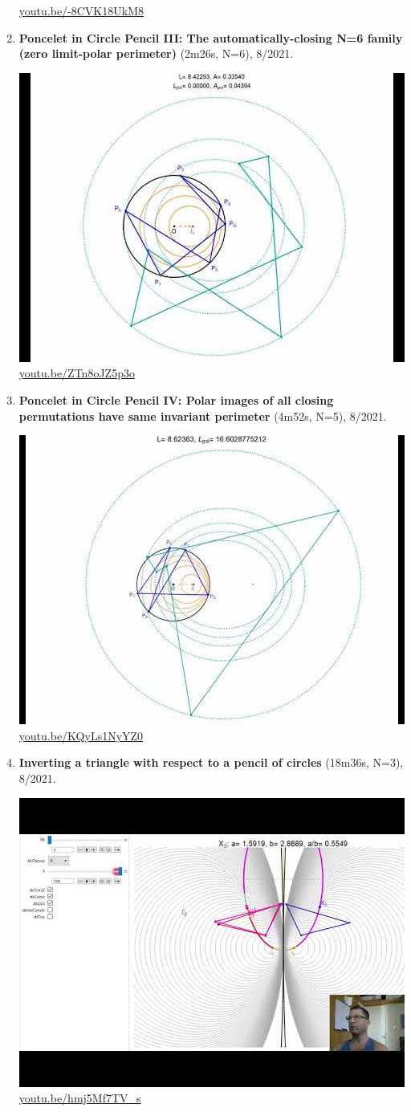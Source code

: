 \documentclass[12pt]{amsart}
\begin{document}
\begin{enumerate}[resume]
\begin{center}
\href{https://youtu.be/-8CVK18UkM8}{\url{youtu.be/-8CVK18UkM8}}\end{center}
% 
\item \textbf{Poncelet in Circle Pencil III: The automatically-closing N=6 family (zero limit-polar perimeter)} (2m26s, N=6), 8/2021. 
\begin{center}\includegraphics[width=.5\textwidth]{pics/ZTn8oJZ5p3o.jpg} \\ 
\href{https://youtu.be/ZTn8oJZ5p3o}{\url{youtu.be/ZTn8oJZ5p3o}}\end{center}
% 
\item \textbf{Poncelet in Circle Pencil IV: Polar images of all closing permutations have same invariant perimeter} (4m52s, N=5), 8/2021. 
\begin{center}\includegraphics[width=.5\textwidth]{pics/KQyLs1NyYZ0.jpg} \\ 
\href{https://youtu.be/KQyLs1NyYZ0}{\url{youtu.be/KQyLs1NyYZ0}}\end{center}
% 
\item \textbf{Inverting a triangle with respect to a pencil of circles} (18m36s, N=3), 8/2021. 
\begin{center}\includegraphics[width=.5\textwidth]{pics/hmj5Mf7TV_s.jpg} \\ 
\href{https://youtu.be/hmj5Mf7TV_s}{\url{youtu.be/hmj5Mf7TV\_s}}\end{center}
% 
\end{enumerate}
\end{document}
